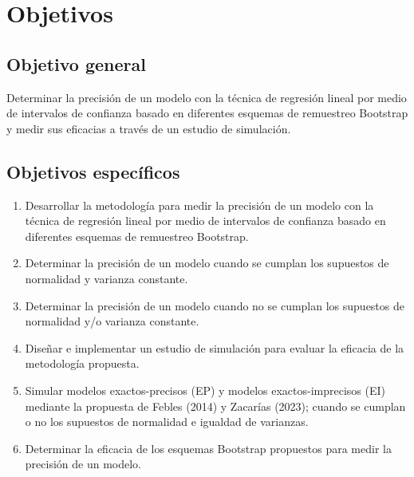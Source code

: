 \section{Objetivos}
\subsection{Objetivo general}
Determinar la precisión de un modelo con la técnica de regresión lineal por medio de intervalos de confianza basado en diferentes esquemas de remuestreo Bootstrap y medir sus eficacias a través de un estudio de simulación.
\vspace{.5cm}
\subsection{Objetivos específicos}
\begin{enumerate}
\item Desarrollar la metodología para medir la precisión de un modelo con la técnica de regresión lineal por medio de intervalos de confianza basado en diferentes esquemas de remuestreo Bootstrap.
\item Determinar la precisión de un modelo cuando se cumplan los supuestos de normalidad y varianza constante.
\item Determinar la precisión de un modelo cuando no se cumplan los supuestos de normalidad y/o varianza constante.
\item Diseñar e implementar un estudio de simulación para evaluar la eficacia de la metodología propuesta.
\item Simular modelos exactos-precisos (EP) y modelos exactos-imprecisos (EI) mediante la propuesta de Febles (2014) y Zacarías (2023); cuando se cumplan o no los supuestos de normalidad e igualdad de varianzas.
\item Determinar la eficacia de los esquemas Bootstrap propuestos para medir la precisión de un modelo.
\end{enumerate}
